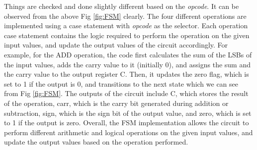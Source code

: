 Things are checked and done slightly different based on the \textit{opcode}.
It can be observed from the above Fig \ref{fig:FSM} clearly.
The four different operations are implemented using a case statement with \textit{opcode} as the selector.
Each operation case statement contains the logic required to perform the operation on the given input values, and update the output values of the circuit accordingly.
For example, for the ADD operation, the code first calculates the sum of the LSBs of the input values, adds the carry value to it (initially 0),
and assigns the sum and the carry value to the output register C.
Then, it updates the zero flag, which is set to 1 if the output is 0, and transitions to the next state which we can see from Fig \ref{fig:FSM}.
The outputs of the circuit include C, which stores the result of the operation,
carr, which is the carry bit generated during addition or subtraction,
sign, which is the sign bit of the output value, and zero, which is set to 1 if the output is zero.
Overall, the FSM implementation allows the circuit to perform different arithmetic and logical
operations on the given input values, and update the output values based on the operation performed.